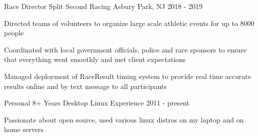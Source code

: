 
\begin{cventries}
  \cventry
    {Race Director} %
    {Split Second Racing} %
    {Asbury Park, NJ} %
    {2018 - 2019} %
    {
      \begin{cvitems} %
        \item {Directed teams of volunteers to organize large scale athletic events for up to 8000 people}
		\item {Coordinated with local government officials, police and race sponsors to ensure that everything went smoothly and met client expectations}
		\item {Managed deployment of RaceResult timing system to provide real time accurate results online and by text message to all participants}
      \end{cvitems}
    }

  \cventry
    {Personal} %
    {8+ Years Desktop Linux Experience} %
    {} %
    {2011 - present} %
    {
      \begin{cvitems} %
        \item {Passionate about open source, used various linux distros on my laptop and on home servers}
      \end{cvitems}
    }

\end{cventries}
